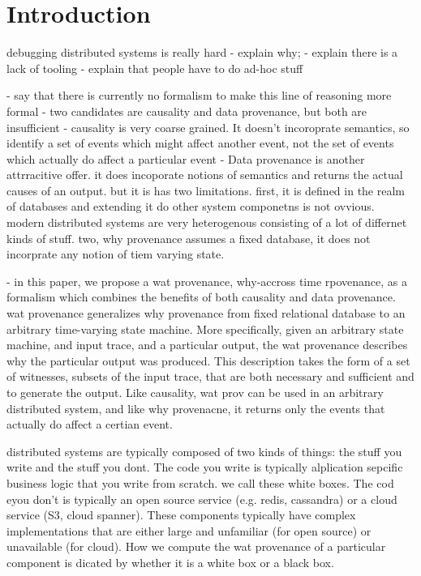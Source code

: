 \section{Introduction}
debugging distributed systems is really hard
  - explain why;
  - explain there is a lack of tooling
  - explain that people have to do ad-hoc stuff

- say that there is currently no formalism to make this line of reasoning more formal
- two candidates are causality and data provenance, but both are insufficient
- causality is very coarse grained. It doesn't incoroprate semantics, so identify a set of events which might affect another event, not the set of events which actually do affect a particular event
- Data provenance is another attrracitive offer. it does incoporate notions of semantics and returns the actual causes of an output. but it is has two limitations. first, it is defined in the realm of databases and extending it do other system componetns is not ovvious. modern distributed systems are very heterogenous consisting of a lot of differnet kinds of stuff. two, why provenance assumes a fixed database, it does not incorprate any notion of tiem varying state.

- in this paper, we propose a wat provenance, why-accross time rpovenance, as a formalism which combines the benefits of both causality and data provenance. wat provenance generalizes why provenance from fixed relational database to an arbitrary time-varying state machine. More specifically, given an arbitrary state machine, and input trace, and a particular output, the wat provenance describes why the particular output was produced. This description takes the form of a set of witnesses, subsets of the input trace, that are both necessary and sufficient and to generate the output. Like causality, wat prov can be used in an arbitrary distributed system, and like why provenacne, it returns only the events that actually do affect a certian event.

distributed systems are typically composed of two kinds of things: the stuff you write and the stuff you dont. The code you write is typically alplication sepcific business logic that you write from scratch. we call these white boxes. The cod eyou don't is typically an open source service (e.g. redis, cassandra) or a cloud service (S3, cloud spanner). These components typically have complex implementations that are either large and unfamiliar (for open source) or unavailable (for cloud). How we compute the wat provenance of a particular component is dicated by whether it is a white box or a black box.

